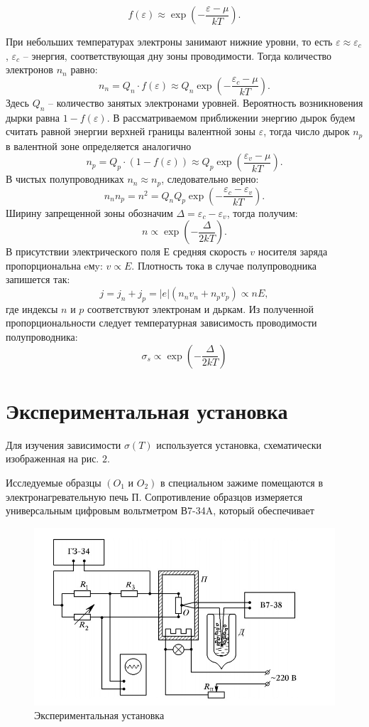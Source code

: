 \documentclass[a4paper, 12pt]{article}%
\begin{document}
$$
f(\varepsilon) \approx \exp \left( - \frac{\varepsilon - \mu}{kT} \right).
$$

При небольших температурах электроны занимают нижние уровни, то есть $\varepsilon \approx \varepsilon_{c}$, 
$\varepsilon_{c}$ -- энергия, соответствующая дну зоны проводимости. Тогда количество электронов $n_n$
равно:
$$
n_{n}=Q_{n} \cdot f(\varepsilon) \approx Q_{n} \exp \left(-\frac{\varepsilon_{c}-\mu}{k T}\right).
$$
Здесь $Q_n$ -- количество занятых электронами уровней.
Вероятность возникновения дырки равна $1 - f(\varepsilon).$ В рассматриваемом приближении энергию дырок будем считать равной энергии верхней границы валентной зоны $\varepsilon$, тогда число дырок $n_p$ в валентной зоне определяется аналогично
$$
n_{p}=Q_{p} \cdot (1-f(\varepsilon)) \approx Q_{p} \exp \left(\frac{\varepsilon_{v}-\mu}{k T}\right).
$$
В чистых полупроводниках $n_n \approx n_p$, следовательно верно:
$$
n_{n} n_{p}=n^{2}=Q_{n} Q_{p} \exp \left(-\frac{\varepsilon_{c}-\varepsilon_{v}}{k T}\right).
$$
Ширину запрещенной зоны обозначим $\Delta=\varepsilon_{c}-\varepsilon_{v}$, тогда получим:
$$
n \propto \exp \left(-\frac{\Delta}{2 k T}\right).
$$
В присутствии электрического поля $Е$ средняя скорость $v$ носителя заряда
пропорциональна eмy: $v \propto E$.
Плотность тока в случае полупроводника запишется так: $$ j=j_n+j_p=|e|\left(n_n v_n+n_p v_p\right) \propto nE, $$ где
индексы $n$ и $p$ соответствуют электронам и дьркам. Из полученной пропорциональности
следует температурная зависимость проводимости полупроводника:
$$
\sigma_{s} \propto \exp \left(-\frac{\Delta}{2 k T}\right)
$$
\newpage

\section{Экспериментальная установка}
Для изучения зависимости $\sigma(T)$ используется установка, схематически изображенная на рис. $2 .$

Исследуемые образцы $\left(O_{1}\right.$ и $\left.O_{2}\right)$ в специальном зажиме помещаются в электронагревательную печь П. Сопротивление образцов измеряется универсальным цифровым вольтметром В7-34A, который обеспечивает

\begin{figure}[h]
\begin{center}
\includegraphics[scale=0.6]{5}
\end{center}
\caption{Экспериментальная установка}
\end{figure}
\end{document}
